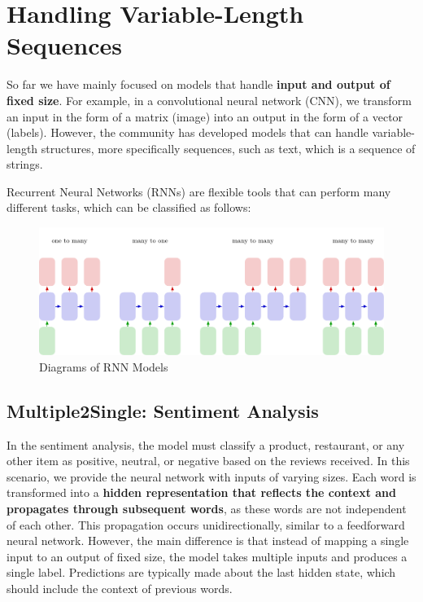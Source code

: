 \section{Handling Variable-Length Sequences}

So far we have mainly focused on models that handle \textbf{input and output of fixed size}. For example, in a convolutional neural network (CNN), we transform an input in the form of a matrix (image) into an output in the form of a vector (labels). However, the community has developed models that can handle variable-length structures, more specifically sequences, such as text, which is a sequence of strings.

Recurrent Neural Networks (RNNs) are flexible tools that can perform many different tasks, which can be classified as follows:

\begin{figure}[!htbp]
    \centering
    \includegraphics[width=\textwidth]{tikz/chapter6 - Types of RNN Models.pdf}
    \caption{Diagrams of RNN Models}
\end{figure}

\subsection{Multiple2Single: Sentiment Analysis}

In the sentiment analysis, the model must classify a product, restaurant, or any other item as positive, neutral, or negative based on the reviews received. In this scenario, we provide the neural network with inputs of varying sizes. Each word is transformed into a \textbf{hidden representation that reflects the context and propagates through subsequent words}, as these words are not independent of each other. This propagation occurs unidirectionally, similar to a feedforward neural network. However, the main difference is that instead of mapping a single input to an output of fixed size, the model takes multiple inputs and produces a single label. Predictions are typically made about the last hidden state, which should include the context of previous words.

